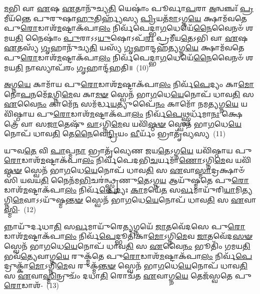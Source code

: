 \-\ul{𑌮}\-𑌭𑌿 𑌵𑌾 \ul{𑌏}\-𑌷 \ul{𑌏}\-𑌤𑌾𑌨𑍁᳴𑌚𑍍𑌯\-\ul{𑌤𑌿} 𑌯𑍇𑌷𑌾𑌂॑ 𑌪𑍂𑌰𑍍𑌵𑌾\-\ul{𑌪}\-𑌰𑌾 \ul{𑌅}\-𑌨𑍍𑌵𑌞𑍍𑌚𑌃᳴ \ul{𑌪𑍍𑌰}\-𑌮𑍀𑌯᳴𑌨𑍍𑌤𑍇 𑌪𑍁𑌰𑍁𑌷𑌾\-\ul{𑌹𑍁}\-𑌤𑌿𑌰𑍍𑌹𑍍𑌯᳴𑌸𑍍𑌯 \ul{𑌪𑍍𑌰𑌿}\-𑌯𑌤᳴\-\ul{𑌮𑌾}\-\-𑌽𑌗𑍍𑌨\-\ul{𑌯𑍇} 𑌕𑍍𑌷𑌾𑌮᳴𑌵𑌤𑍇 𑌪𑍁\-\ul{𑌰𑍋}\-𑌡𑌾𑌶᳴\-\-\ul{𑌮}\-𑌷𑍍𑌟𑌾\-𑌕᳴𑌪𑌾\-\ul{𑌲𑌂} 𑌨𑌿𑌰𑍍𑌵᳴𑌪𑍇𑌦𑍍𑌭𑌾\-\ul{𑌗}\-𑌧𑍇𑌯𑍇᳴\-\ul{𑌨𑍈}\-𑌵𑍈𑌨𑍞᳴ 𑌶𑌮𑌯\-\ul{𑌤𑌿} 𑌨𑍈𑌷𑌾𑌂॑ \ul{𑌪𑍁}\-𑌰𑌾\-𑌽\-𑌽\-\ul{𑌯𑍁}\-𑌷𑍋\-𑌽𑌪᳴\-\ul{𑌰𑌃} 𑌪𑍍𑌰𑌮𑍀᳴𑌯\-\ul{𑌤𑍇}\-\-𑌽𑌭𑌿 𑌵𑌾 \ul{𑌏}\-𑌷 \ul{𑌏}\-𑌤𑌸𑍍𑌯᳴ \ul{𑌗𑍃}\-𑌹𑌾𑌨𑍁᳴𑌚𑍍𑌯\-\ul{𑌤𑌿} 𑌯𑌸𑍍𑌯᳴ \ul{𑌗𑍃}\-𑌹𑌾𑌨𑍍𑌦𑌹᳴\-\ul{𑌤𑍍𑌯}\-𑌗𑍍𑌨\-\ul{𑌯𑍇} 𑌕𑍍𑌷𑌾𑌮᳴𑌵𑌤𑍇 𑌪𑍁\-\ul{𑌰𑍋}\-𑌡𑌾𑌶᳴\-\-\ul{𑌮}\-𑌷𑍍𑌟𑌾\-𑌕᳴𑌪𑌾\-\ul{𑌲𑌂} 𑌨𑌿𑌰𑍍𑌵᳴𑌪𑍇𑌦𑍍𑌭𑌾\-\ul{𑌗}\-𑌧𑍇𑌯𑍇᳴\-\ul{𑌨𑍈}\-𑌵𑍈𑌨𑍞᳴ 𑌶𑌮𑌯\-\ul{𑌤𑌿} 𑌨𑌾𑌸𑍍𑌯𑌾𑌪᳴𑌰𑌂 \ul{𑌗𑍃}\-𑌹𑌾𑌨𑍍𑌦᳴𑌹𑌤𑌿॥~(10)

{\anuvakamend[{\-\ul{𑌵𑍍𑌰}\-𑌤𑌪᳴𑌤\-\ul{𑌯𑍇} 𑌨𑌿𑌶𑌿᳴𑌤𑌾\-\ul{𑌯𑌾}\-𑌨𑍍𑌨𑌿𑌰𑍍𑌵᳴\-\ul{𑌪𑍇}\-𑌤𑍍𑌪𑍁𑌰𑍁᳴𑌷𑌾𑌃 𑌸\-\ul{𑌙𑍍𑌗𑍍𑌰𑌾}\-𑌮𑌨𑍍𑌨 \ul{𑌚}\-𑌤𑍍𑌵𑌾𑌰𑌿᳴ 𑌚}]}%

\-\ul{𑌅}\-𑌗𑍍𑌨\-\ul{𑌯𑍇} 𑌕𑌾𑌮𑌾᳴𑌯 𑌪𑍁\-\ul{𑌰𑍋}\-𑌡𑌾𑌶᳴\-\-\ul{𑌮}\-𑌷𑍍𑌟𑌾\-𑌕᳴𑌪𑌾\-\ul{𑌲𑌂} 𑌨𑌿𑌰𑍍𑌵᳴\-\ul{𑌪𑍇}\-𑌦𑍍𑌯𑌂 𑌕𑌾\-\ul{𑌮𑍋} 𑌨𑍋\-\ul{𑌪}\-𑌨𑌮𑍇᳴\-\ul{𑌦}\-𑌗𑍍𑌨𑌿\-\ul{𑌮𑍇}\-𑌵 𑌕𑌾\-\ul{𑌮}\-\-\ul{𑍟} 𑌸𑍍𑌵𑍇𑌨᳴ 𑌭𑌾\-\ul{𑌗}\-𑌧𑍇\-\ul{𑌯𑍇}\-𑌨𑍋𑌪᳴ 𑌧𑌾𑌵\-\ul{𑌤𑌿} 𑌸 \ul{𑌏}\-𑌵𑍈\-\ul{𑌨𑌂} 𑌕𑌾𑌮𑍇᳴\-\ul{𑌨} 𑌸𑌮᳴𑌰𑍍𑌦𑍍𑌧\-\ul{𑌯}\-𑌤𑍍𑌯𑍁𑌪𑍈᳴\-\ul{𑌨𑌂} 𑌕𑌾𑌮𑍋᳴ 𑌨𑌮\-\ul{𑌤𑍍𑌯}\-𑌗𑍍𑌨\-\ul{𑌯𑍇} 𑌯𑌵𑌿᳴𑌷𑍍𑌠𑌾𑌯 𑌪𑍁\-\ul{𑌰𑍋}\-𑌡𑌾𑌶᳴\-\-\ul{𑌮}\-𑌷𑍍𑌟𑌾\-𑌕᳴𑌪𑌾\-\ul{𑌲𑌂} 𑌨𑌿𑌰𑍍𑌵᳴\-\ul{𑌪𑍇}\-𑌥𑍍𑌸𑍍𑌪𑌰𑍍𑌧᳴𑌮𑌾\-\ul{𑌨𑌃} 𑌕𑍍𑌷𑍇𑌤𑍍𑌰𑍇᳴ 𑌵𑌾 𑌸\-\ul{𑌜𑌾}\-𑌤𑍇𑌷𑍁᳴ \ul{𑌵𑌾}\-\-𑌽𑌗𑍍𑌨𑌿\-\ul{𑌮𑍇}\-𑌵 𑌯𑌵𑌿᳴\-\ul{𑌷𑍍𑌠}\-\-\ul{𑍟} 𑌸𑍍𑌵𑍇𑌨᳴ 𑌭𑌾\-\ul{𑌗}\-𑌧𑍇\-\ul{𑌯𑍇}\-𑌨𑍋𑌪᳴ 𑌧𑌾𑌵\-\ul{𑌤𑌿} 𑌤𑍇\-\ul{𑌨𑍈}\-𑌵𑍇\-\ul{𑌨𑍍𑌦𑍍𑌰𑌿}\-𑌯𑌂 \ul{𑌵𑍀}\-𑌰𑍍𑌯𑌂᳴ 𑌭𑍍𑌰𑌾𑌤𑍃᳴𑌵𑍍𑌯𑌸𑍍𑌯~(11)

𑌯𑍁𑌵\-\ul{𑌤𑍇} 𑌵𑌿 \ul{𑌪𑌾}\-𑌪𑍍𑌮\-\ul{𑌨𑌾} 𑌭𑍍𑌰𑌾𑌤𑍃᳴𑌵𑍍𑌯𑍇𑌣 𑌜𑌯\-\ul{𑌤𑍇}\-\-𑌽𑌗𑍍𑌨\-\ul{𑌯𑍇} 𑌯𑌵𑌿᳴𑌷𑍍𑌠𑌾𑌯 𑌪𑍁\-\ul{𑌰𑍋}\-𑌡𑌾𑌶᳴\-\-\ul{𑌮}\-𑌷𑍍𑌟𑌾\-𑌕᳴𑌪𑌾\-\ul{𑌲𑌂} 𑌨𑌿𑌰𑍍𑌵᳴𑌪𑍇𑌦𑌭𑌿\-\ul{𑌚}\-𑌰𑍍𑌯𑌮𑌾᳴\-\ul{𑌣𑍋}\-\-𑌽𑌗𑍍𑌨𑌿\-\ul{𑌮𑍇}\-𑌵 𑌯𑌵𑌿᳴\-\ul{𑌷𑍍𑌠}\-\-\ul{𑍟} 𑌸𑍍𑌵𑍇𑌨᳴ 𑌭𑌾\-\ul{𑌗}\-𑌧𑍇\-\ul{𑌯𑍇}\-𑌨𑍋𑌪᳴ 𑌧𑌾𑌵\-\ul{𑌤𑌿} 𑌸 \ul{𑌏}\-𑌵𑌾\-\ul{𑌸𑍍𑌮𑌾}\-𑌦𑍍𑌰𑌕𑍍𑌷𑌾𑍞᳴𑌸𑌿 𑌯𑌵𑌯\-\ul{𑌤𑌿} 𑌨𑍈𑌨᳴𑌮\-\ul{𑌭𑌿}\-𑌚𑌰॑𑌨𑍍𑌥𑍍𑌸𑍍𑌤𑍃𑌣𑍁\-\ul{𑌤𑍇}\-\-𑌽𑌗𑍍𑌨\-\ul{𑌯} 𑌆𑌯𑍁᳴𑌷𑍍𑌮𑌤𑍇 𑌪𑍁\-\ul{𑌰𑍋}\-𑌡𑌾𑌶᳴\-\-\ul{𑌮}\-𑌷𑍍𑌟𑌾\-𑌕᳴𑌪𑌾\-\ul{𑌲𑌂} 𑌨𑌿𑌰𑍍𑌵᳴\-\ul{𑌪𑍇}\-𑌦𑍍𑌯𑌃 \ul{𑌕𑌾}\-𑌮𑌯𑍇᳴\-\ul{𑌤} 𑌸\-\ul{𑌰𑍍𑌵}\-𑌮𑌾𑌯𑍁᳴𑌰𑌿\-\ul{𑌯𑌾}\-𑌮𑌿\-\ul{𑌤𑍍𑌯}\-𑌗𑍍𑌨𑌿\-\ul{𑌮𑍇}\-𑌵𑌾𑌽𑌽𑌯𑍁᳴𑌷𑍍𑌮\-\ul{𑌨𑍍𑌤}\-\-\ul{𑍟} 𑌸𑍍𑌵𑍇𑌨᳴ 𑌭𑌾\-\ul{𑌗}\-𑌧𑍇\-\ul{𑌯𑍇}\-𑌨𑍋𑌪᳴ 𑌧𑌾𑌵\-\ul{𑌤𑌿} 𑌸 \ul{𑌏}\-𑌵𑌾\-\ul{𑌸𑍍𑌮𑌿}\--~(12)

𑌨𑍍𑌨𑌾𑌯𑍁᳴𑌰𑍍𑌦𑌧𑌾\-\ul{𑌤𑌿} 𑌸\-\ul{𑌰𑍍𑌵}\-𑌮𑌾𑌯𑍁᳴𑌰𑍇\-\ul{𑌤𑍍𑌯}\-𑌗𑍍𑌨𑌯𑍇᳴ \ul{𑌜𑌾}\-𑌤𑌵𑍇᳴𑌦𑌸𑍇 𑌪𑍁\-\ul{𑌰𑍋}\-𑌡𑌾𑌶᳴\-\-\ul{𑌮}\-𑌷𑍍𑌟𑌾\-𑌕᳴𑌪𑌾\-\ul{𑌲𑌂} 𑌨𑌿𑌰𑍍𑌵᳴\-\ul{𑌪𑍇}\-𑌦𑍍𑌭𑍂𑌤𑌿᳴𑌕𑌾\-\ul{𑌮𑍋}\-\-𑌽𑌗𑍍𑌨𑌿\-\ul{𑌮𑍇}\-𑌵 \ul{𑌜𑌾}\-𑌤𑌵𑍇᳴𑌦\-\ul{𑌸}\-\-\ul{𑍟} 𑌸𑍍𑌵𑍇𑌨᳴ 𑌭𑌾\-\ul{𑌗}\-𑌧𑍇\-\ul{𑌯𑍇}\-𑌨𑍋𑌪᳴ 𑌧𑌾𑌵\-\ul{𑌤𑌿} 𑌸 \ul{𑌏}\-𑌵𑍈\-\ul{𑌨𑌂} 𑌭𑍂𑌤𑌿𑌂᳴ 𑌗𑌮𑌯\-\ul{𑌤𑌿} 𑌭𑌵᳴\-\ul{𑌤𑍍𑌯𑍇}\-𑌵𑌾𑌗𑍍𑌨\-\ul{𑌯𑍇} 𑌰𑍁𑌕𑍍𑌮᳴𑌤𑍇 𑌪𑍁\-\ul{𑌰𑍋}\-𑌡𑌾𑌶᳴\-\-\ul{𑌮}\-𑌷𑍍𑌟𑌾\-𑌕᳴𑌪𑌾\-\ul{𑌲𑌂} 𑌨𑌿𑌰𑍍𑌵᳴\-\ul{𑌪𑍇}\-𑌦𑍍𑌰𑍁𑌕𑍍𑌕𑌾᳴\-\ul{𑌮𑍋}\-\-𑌽𑌗𑍍𑌨𑌿\-\ul{𑌮𑍇}\-𑌵 𑌰𑍁𑌕𑍍𑌮᳴\-\ul{𑌨𑍍𑌤}\-\-\ul{𑍟} 𑌸𑍍𑌵𑍇𑌨᳴ 𑌭𑌾\-\ul{𑌗}\-𑌧𑍇\-\ul{𑌯𑍇}\-𑌨𑍋𑌪᳴ 𑌧𑌾𑌵\-\ul{𑌤𑌿} 𑌸 \ul{𑌏}\-𑌵𑌾\-\ul{𑌸𑍍𑌮𑌿}\-𑌨𑍍𑌰𑍁𑌚𑌂᳴ 𑌦𑌧𑌾\-\ul{𑌤𑌿} 𑌰𑍋𑌚᳴𑌤 \ul{𑌏}\-𑌵𑌾𑌗𑍍𑌨\-\ul{𑌯𑍇} 𑌤𑍇𑌜᳴𑌸𑍍𑌵𑌤𑍇 𑌪𑍁\-\ul{𑌰𑍋}\-𑌡𑌾𑌶᳴-~(13)

